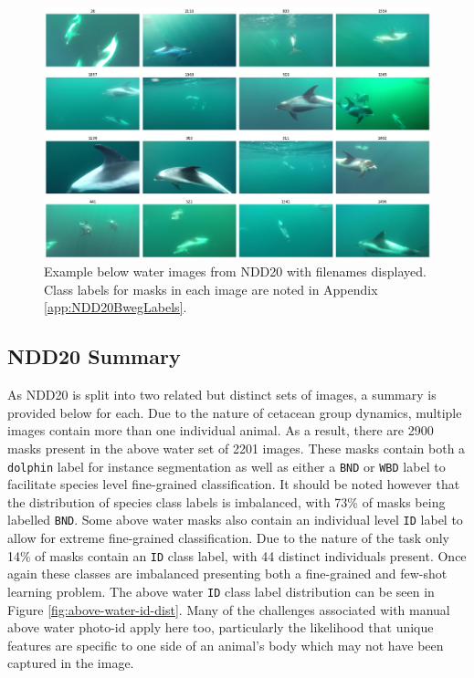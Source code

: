 \begin{figure}
	\begin{center}
		\includegraphics[scale=0.3]{Chapter4/figs/bweg-tiled.png}
	\end{center}
	\caption[Example below water images from NDD20 with filenames displayed.]{Example below water images from NDD20 with filenames displayed. Class labels for masks in each image are noted in Appendix \ref{app:NDD20BwegLabels}.}
	\label{fig:below-water-example}
\end{figure}

\subsection{NDD20 Summary}\label{ch:NDD,sec:NDD20,sub:NDD20Summary}

As NDD20 is split into two related but distinct sets of images, a summary is provided below for each. Due to the nature of cetacean group dynamics, multiple images contain more than one individual animal. As a result, there are 2900 masks present in the above water set of 2201 images. These masks contain both a \texttt{dolphin} label for instance segmentation as well as either a \texttt{BND} or \texttt{WBD} label to facilitate species level fine-grained classification. It should be noted however that the distribution of species class labels is imbalanced, with 73\% of masks being labelled \texttt{BND}. Some above water masks also contain an individual level \texttt{ID} label to allow for extreme fine-grained classification. Due to the nature of the task only 14\% of masks contain an \texttt{ID} class label, with 44 distinct individuals present. Once again these classes are imbalanced presenting both a fine-grained and few-shot learning problem. The above water \texttt{ID} class label distribution can be seen in Figure \ref{fig:above-water-id-dist}. Many of the challenges associated with manual above water photo-id apply here too, particularly the likelihood that unique features are specific to one side of an animal's body which may not have been captured in the image.

